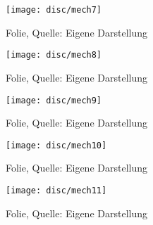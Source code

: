 \begin{figure}[H]
    \centering
    \texttt{[image: disc/mech7]}
    \caption[Folie]{Folie, Quelle: Eigene Darstellung}
    \label{fig:mech7}
\end{figure}

\begin{figure}[H]
    \centering
    \texttt{[image: disc/mech8]}
    \caption[Folie]{Folie, Quelle: Eigene Darstellung}
    \label{fig:mech8}
\end{figure}

\begin{figure}[H]
    \centering
    \texttt{[image: disc/mech9]}
    \caption[Folie]{Folie, Quelle: Eigene Darstellung}
    \label{fig:mech9}
\end{figure}

\begin{figure}[H]
    \centering
    \texttt{[image: disc/mech10]}
    \caption[Folie]{Folie, Quelle: Eigene Darstellung}
    \label{fig:mech10}
\end{figure}

\begin{figure}[H]
    \centering
    \texttt{[image: disc/mech11]}
    \caption[Folie]{Folie, Quelle: Eigene Darstellung}
    \label{fig:mech11}
\end{figure}